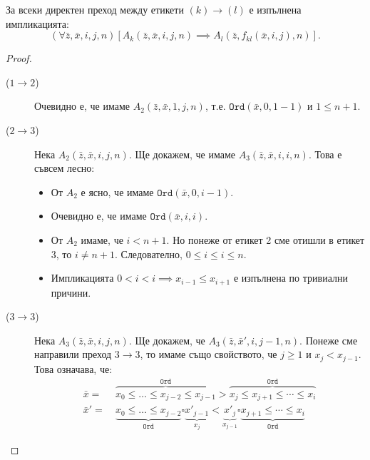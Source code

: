 \begin{prop}
  За всеки директен преход между етикети $(k) \to (l)$ е изпълнена импликацията:
  \[(\forall\bar{z},\bar{x},i,j,n)[A_k(\bar{z},\bar{x},i,j,n) \implies A_l(\bar{z},f_{kl}(\bar{x},i,j),n)].\]
\end{prop}
\begin{proof}
  \begin{description}
  \item[($1\to 2$)]
    Очевидно е, че имаме $A_2(\bar{z},\bar{x},1,j,n)$, т.е. $\texttt{Ord}(\bar{x},0,1-1)$ и $1 \leq n+1$.
  \item[($2 \to 3$)]
    Нека $A_2(\bar{z},\bar{x},i,j,n)$.
    Ще докажем, че имаме $A_3(\bar{z},\bar{x},i,i,n)$. Това е съвсем лесно:
    \begin{itemize}
    \item 
      От $A_2$ е ясно, че имаме $\texttt{Ord}(\bar{x},0,i-1)$.
    \item
      Очевидно е, че имаме $\texttt{Ord}(\bar{x},i,i)$.
    \item
      От $A_2$ имаме, че $i < n+1$. Но понеже от етикет 2 сме отишли в етикет 3, 
      то $i \neq n+1$. Следователно, $0 \leq i \leq i \leq n$.
    \item
      Импликацията $0 < i < i \implies x_{i-1}\leq x_{i+1}$  
      е изпълнена по тривиални причини.
    \end{itemize}
  \item[($3\to 3$)]
  Нека $A_3(\bar{z},\bar{x},i,j,n)$.
  Ще докажем, че $A_3(\bar{z},\bar{x}',i,j-1,n)$.
  Понеже сме направили преход $3 \to 3$,
  то имаме също свойството, че $j \geq 1$ и $x_{j} < x_{j-1}$.
  Това означава, че:
  \begin{align*}
    \bar{x} =\ & \overbrace{x_0 \leq \dots \leq x_{j-2}\leq x_{j-1}}^{\texttt{Ord}} > \overbrace{x_j \leq x_{j+1} \leq \cdots \leq x_i}^{\texttt{Ord}}\\
    \bar{x}' =\ & \underbrace{x_0 \leq \dots \leq x_{j-2}}_{\texttt{Ord}} \square \underbrace{x'_{j-1}}_{x_j} < \underbrace{x'_j}_{x_{j-1}} \square \underbrace{x_{j+1} \leq \cdots \leq x_i}_{\texttt{Ord}}
  \end{align*}
  

\end{description}
\end{proof}
